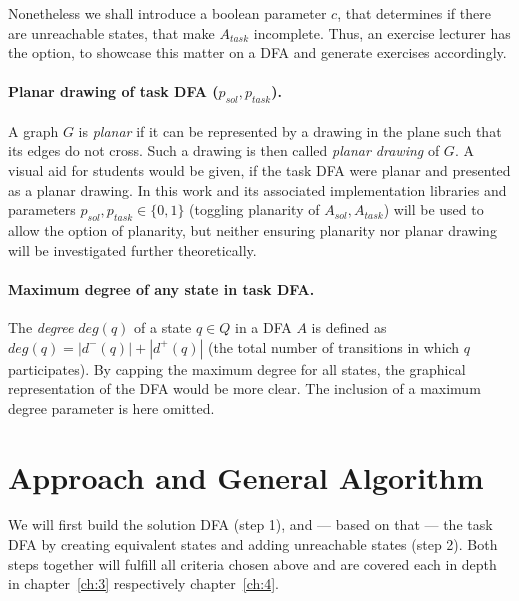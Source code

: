 Nonetheless we shall introduce a boolean parameter $c$, that determines if there are unreachable states, that make $A_{task}$ incomplete. Thus, an exercise lecturer has the option, to showcase this matter on a DFA and generate exercises accordingly.

\paragraph*{Planar drawing of task DFA \texorpdfstring{($p_{sol}, p_{task}$)}{}.}

A graph $G$ is \emph{planar} if it can be represented by a drawing in the plane such that its edges do not cross. Such a drawing is then called \emph{planar drawing} of $G$. A visual aid for students would be given, if the task DFA were planar and presented as a planar drawing. In this work and its associated implementation libraries and parameters $p_{sol}, p_{task} \in \{0,1\}$ (toggling planarity of $A_{sol}, A_{task}$) will be used to allow the option of planarity, but neither ensuring planarity nor planar drawing will be investigated further theoretically.

\paragraph*{Maximum degree of any state in task DFA.}

The \emph{degree} $deg(q)$ of a state $q \in Q$ in a DFA $A$ is defined as $deg(q) = |d^-(q)| + |d^+(q)|$ (the total number of transitions in which $q$ participates). By capping the maximum degree for all states, the graphical representation of the DFA would be more clear. The inclusion of a maximum degree parameter is here omitted.


\section{Approach and General Algorithm}

We will first build the solution DFA (step 1), and --- based on that --- the task DFA by creating equivalent states and adding unreachable states (step 2). Both steps together will fulfill all criteria chosen above and are covered each in depth in chapter~\ref{ch:3} respectively chapter~\ref{ch:4}.

